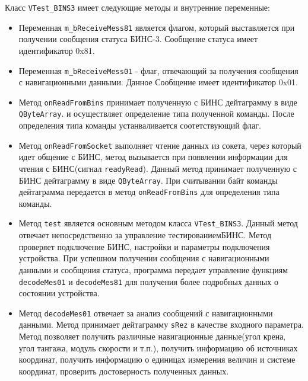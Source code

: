 Класс \texttt{VTest\_BINS3} имеет следующие методы и внутренние переменные:
\begin{itemize}
	\item Переменная \texttt{m\_bReceiveMess81} является флагом, который выставляется при получении сообщения
		статуса БИНС-3. Сообщение статуса имеет идентификатор 0x81.

	\item Переменная \texttt{m\_bReceiveMess01} - флаг, отвечающий за получения сообщения с навигационными данными.
		Данное Сообщение имеет идентификатор 0x01.

	\item Метод \texttt{onReadFromBins} принимает полученную с БИНС дейтаграмму в виде \texttt{QByteArray}.
		и осуществляет определение типа полученной команды. После определения типа команды устанваливается
		соотетствующий флаг.

	\item Метод \texttt{onReadFromSocket} выполняет чтение данных из сокета, через который идет общение с БИНС,
		метод вызывается при появлении информации для чтения с БИНС(сигнал \texttt{readyRead}).
		Данный метод принимает полученную с БИНС дейтаграмму в виде \texttt{QByteArray}.
		При считывании байт команды дейтаграмма передается в метод \texttt{onReadFromBins} для определения типа
		команды.

	\item Метод \texttt{test} является основным методом класса \texttt{VTest\_BINS3}. Данный метод отвечает
		непосредственно за управление тестированием\break БИНС. Метод проверяет подключение БИНС, настройки и
		параметры подключения устройства. При успешном получении сообщения с навигационными данными и сообщения
		статуса, программа передает управление функциям \texttt{decodeMes01} и \texttt{decodeMes81} для
		получения более подробных данных о состоянии устройства.

	\item Метод \texttt{decodeMes01} отвечает за анализ сообщений с навигационными данными. Метод принимает
		дейтаграмму \texttt{sRez} в качестве входного параметра. Метод позволяет получить
		различные навигационные данные(угол крена, угол тангажа, модуль скорости и т.п.), получить информацию об
		источниках координат, получить информацию о единицах измерения величин и системе координат, проверить
		достоверность полученных данных.


\end{itemize}
